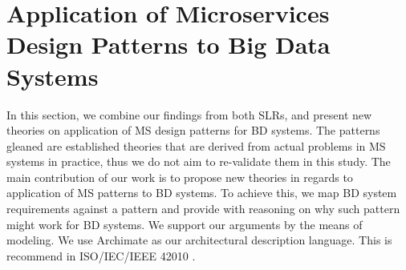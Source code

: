 \documentclass[a4paper,11pt,article,oneside]{memoir}
\begin{document}

        
        

        

        
        

        

             
        

        



\chapter{Application of Microservices Design Patterns to Big Data Systems}


In this section, we combine our findings from both SLRs, and present new theories on application of MS design patterns for BD systems. The patterns gleaned are established theories that are derived from actual problems in MS systems in practice, thus we do not aim to re-validate them in this study. The main contribution of our work is to propose new theories in regards to application of MS patterns to BD systems. To achieve this, we map BD system requirements against a pattern and provide with reasoning on why such pattern might work for BD systems. We support our arguments by the means of modeling. We use Archimate as our architectural description language. This is recommend in ISO/IEC/IEEE 42010 \citep{Chaabane}. 

\end{document}
